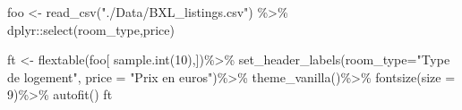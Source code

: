 \documentclass[
]{book}
\newenvironment{Shaded}{\begin{snugshade}}{\end{snugshade}}
\newcommand{\AttributeTok}[1]{\textcolor[rgb]{0.77,0.63,0.00}{#1}}
\newcommand{\DecValTok}[1]{\textcolor[rgb]{0.00,0.00,0.81}{#1}}
\newcommand{\FunctionTok}[1]{\textcolor[rgb]{0.00,0.00,0.00}{#1}}
\newcommand{\NormalTok}[1]{#1}
\newcommand{\OtherTok}[1]{\textcolor[rgb]{0.56,0.35,0.01}{#1}}
\newcommand{\SpecialCharTok}[1]{\textcolor[rgb]{0.00,0.00,0.00}{#1}}
\newcommand{\StringTok}[1]{\textcolor[rgb]{0.31,0.60,0.02}{#1}}
\begin{document}
\begin{Shaded}
\begin{Highlighting}[]
\NormalTok{foo }\OtherTok{\textless{}{-}} \FunctionTok{read\_csv}\NormalTok{(}\StringTok{"./Data/BXL\_listings.csv"}\NormalTok{) }\SpecialCharTok{\%\textgreater{}\%}
\NormalTok{  dplyr}\SpecialCharTok{::}\FunctionTok{select}\NormalTok{(room\_type,price) }

\NormalTok{ft }\OtherTok{\textless{}{-}} \FunctionTok{flextable}\NormalTok{(foo[ }\FunctionTok{sample.int}\NormalTok{(}\DecValTok{10}\NormalTok{),])}\SpecialCharTok{\%\textgreater{}\%}
   \FunctionTok{set\_header\_labels}\NormalTok{(}\AttributeTok{room\_type=}\StringTok{"Type de logement"}\NormalTok{,}
  \AttributeTok{price =} \StringTok{"Prix en euros"}\NormalTok{)}\SpecialCharTok{\%\textgreater{}\%}
  \FunctionTok{theme\_vanilla}\NormalTok{()}\SpecialCharTok{\%\textgreater{}\%} \FunctionTok{fontsize}\NormalTok{(}\AttributeTok{size =} \DecValTok{9}\NormalTok{)}\SpecialCharTok{\%\textgreater{}\%}
  \FunctionTok{autofit}\NormalTok{()}
\NormalTok{ft}
\end{Highlighting}
\end{Shaded}

\providecommand{\docline}[3]{\noalign{\global\setlength{\arrayrulewidth}{#1}}\arrayrulecolor[HTML]{#2}\cline{#3}}

\setlength{\tabcolsep}{2pt}

\renewcommand*{\arraystretch}{1.5}
\end{document}

